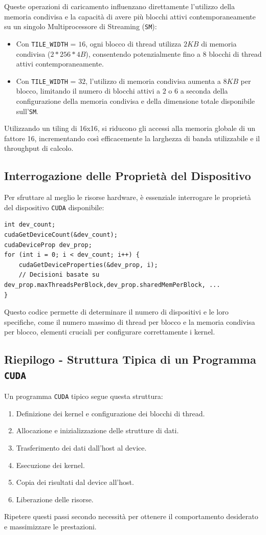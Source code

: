 Queste operazioni di caricamento influenzano direttamente l'utilizzo
della memoria condivisa e la capacità di avere più blocchi attivi
contemporaneamente su un singolo Multiprocessore di Streaming (\texttt{SM}):
\begin{itemize}
    \item Con \texttt{TILE\_WIDTH} = $16$, ogni blocco di thread utilizza
    $2KB$ di memoria condivisa ($2*256*4B$), consentendo potenzialmente
    fino a 8 blocchi di thread attivi contemporaneamente.
    \item Con \texttt{TILE\_WIDTH} = $32$, l'utilizzo di memoria condivisa
    aumenta a $8KB$ per blocco, limitando il numero di blocchi attivi a
    $2$ o $6$ a seconda della configurazione della memoria condivisa e
    della dimensione totale disponibile sull'\texttt{SM}.
\end{itemize}

Utilizzando un tiling di 16x16, si riducono gli accessi alla memoria
globale di un fattore 16, incrementando così efficacemente la larghezza
di banda utilizzabile e il throughput di calcolo.

\subsection{Interrogazione delle Proprietà del Dispositivo}
Per sfruttare al meglio le risorse hardware, è essenziale interrogare
le proprietà del dispositivo \texttt{CUDA} disponibile:
\begin{lstlisting}
int dev_count;
cudaGetDeviceCount(&dev_count);
cudaDeviceProp dev_prop;
for (int i = 0; i < dev_count; i++) {
    cudaGetDeviceProperties(&dev_prop, i);
    // Decisioni basate su dev_prop.maxThreadsPerBlock,dev_prop.sharedMemPerBlock, ...
}
\end{lstlisting}
Questo codice permette di determinare il numero di dispositivi e
le loro specifiche, come il numero massimo di thread per blocco e
la memoria condivisa per blocco, elementi cruciali per configurare
correttamente i kernel.

\subsection{Riepilogo - Struttura Tipica di un Programma \texttt{CUDA}}
Un programma \texttt{CUDA} tipico segue questa struttura:
\begin{enumerate}
    \item Definizione dei kernel e configurazione dei blocchi di thread.
    \item Allocazione e inizializzazione delle strutture di dati.
    \item Trasferimento dei dati dall'host al device.
    \item Esecuzione dei kernel.
    \item Copia dei risultati dal device all'host.
    \item Liberazione delle risorse.
\end{enumerate}
Ripetere questi passi secondo necessità per ottenere il comportamento
desiderato e massimizzare le prestazioni.

